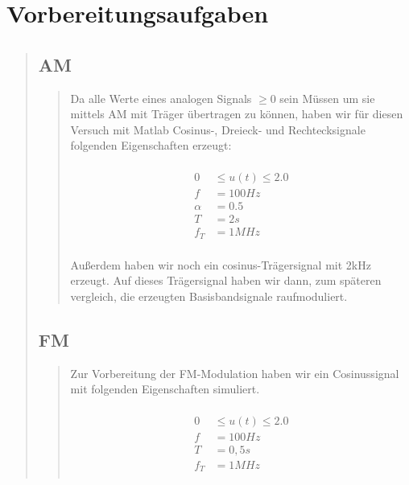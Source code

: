 \section{Vorbereitungsaufgaben}
\begin{quote}
    \hspace{-2em}
    \subsection{AM}
        
    \begin{quote}
        
        Da alle Werte eines analogen Signals $\geq 0$ sein Müssen um sie mittels AM mit Träger übertragen zu können, haben wir für
        diesen Versuch mit Matlab Cosinus-, Dreieck- und Rechtecksignale folgenden Eigenschaften erzeugt:
        
        
        \begin{equation*}
        \begin{split}
        \\
                 0 &\leq u(t) \leq 2.0
        \\
                 f &= \si{100}{Hz}
        \\
            \alpha &= 0.5
        \\
                 T &= \si{2}{s}
        \\
               f_T &= \si{1}{MHz}
        \\
        \end{split}
        \end{equation*}
        
        
        Außerdem haben wir noch ein cosinus-Trägersignal mit \si{2}{kHz} erzeugt. Auf dieses Trägersignal haben wir dann, zum
        späteren vergleich, die erzeugten Basisbandsignale raufmoduliert.
        
    \end{quote}
    
    
    
    
    \subsection{FM}
    \begin{quote}
        
        
        Zur Vorbereitung der FM-Modulation haben wir ein Cosinussignal mit folgenden Eigenschaften simuliert.
        
        \begin{equation*}
        \begin{split}
        \\
                 0 &\leq u(t) \leq 2.0
        \\
                 f &= \si{100}{Hz}
        \\
                 T &= \si{0,5}{s}
        \\
               f_T &= \si{1}{MHz}
        \\
        \end{split}
        \end{equation*}
        

\end{quote}
\end{quote}
